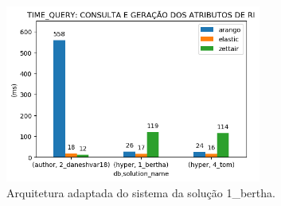 \begin{figure}[h]
    \centering
    \caption{Arquitetura adaptada do sistema da solução 1\_bertha.}
    \begin{center}
        \includegraphics[width=0.75\textwidth]{img/time-query.png}
    \end{center}
    \vspace{-0.5cm}
    \label{fig:1-bertha-arquitetura-com-ri}
\end{figure}